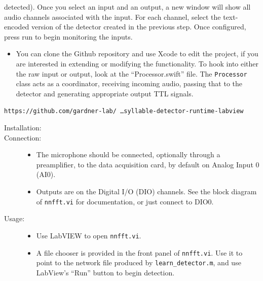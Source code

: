 \documentclass[10pt,letterpaper]{article}
\providecommand{\DIFaddtex}[1]{{\protect\color{blue}\uwave{#1}}} %
\providecommand{\DIFdeltex}[1]{{\protect\color{red}\sout{#1}}}                      %
\providecommand{\DIFaddbegin}{} %
\providecommand{\DIFaddend}{} %
\providecommand{\DIFdelbegin}{} %
\providecommand{\DIFdelend}{} %
\providecommand{\DIFadd}[1]{\texorpdfstring{\DIFaddtex{#1}}{#1}} %
\providecommand{\DIFdel}[1]{\texorpdfstring{\DIFdeltex{#1}}{}} %
\begin{document}
\begin{description}
\begin{description}
\begin{description}
\begin{itemize}
      detected). Once you select an input and an output, a new window will show all audio 
      channels associated with the input. For each channel, select the text-encoded version of 
      the detector created in the previous step. Once configured, press run to begin 
      monitoring the inputs.
       \end{itemize} 
    \item[Customisation:]\hfill
       \begin{itemize} 
      \item You can clone the Github repository and use Xcode to edit the project, if you 
      are interested in extending or modifying the functionality. To hook into either 
      the raw input or output, look at the ``Processor.swift'' file. The 
      {\tt Processor} class acts as a coordinator, receiving incoming audio, passing that
      to the detector and generating appropriate output TTL signals.
       \end{itemize} 
     \end{description} 
    \DIFaddbegin 

  \DIFaddend \item[LabVIEW:]\DIFaddbegin \hfill
    \begin{trivlist}
    \item \DIFaddend {\tt https://github.com/gardner-lab/\DIFdelbegin %
\DIFdel{\ }\DIFdelend syllable-detector-runtime-labview}
    \DIFaddbegin \item \DIFadd{10.5281/zenodo.437558 
    }\end{trivlist}
    \DIFaddend  \begin{description} 
    \item[Installation:]\hfill
    \item[Connection:]\hfill
       \begin{itemize} 
      \item The microphone should be connected, optionally through a preamplifier, to the data acquisition card, by default on Analog Input 0 (AI0).
      \item Outputs are on the Digital I/O (DIO) channels.  See the block diagram of {\tt nnfft.vi} for documentation, or just connect to DIO0.
       \end{itemize} 
    \item[Usage:]\hfill
       \begin{itemize} 
      \item Use LabVIEW to open {\tt nnfft.vi}.
        \item A file chooser is provided in the front panel of {\tt nnfft.vi}.  Use it to point to the network file
      produced by {\tt learn\_detector.m}, and use LabView's ``Run''
      button to begin detection.
       \end{itemize} 
     \end{description} 
   \end{description} 


\end{description}
\end{document}
